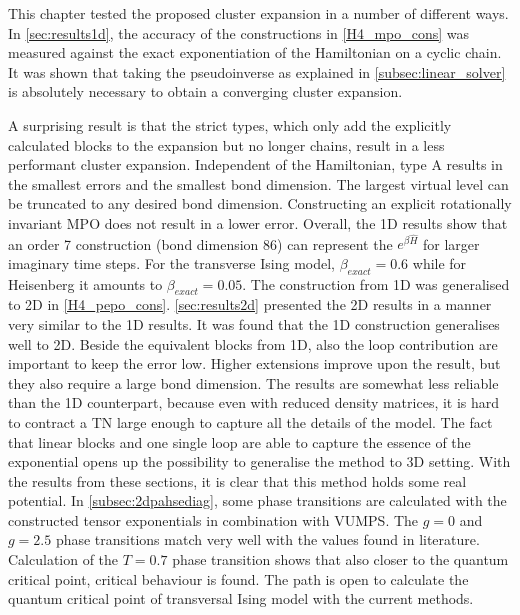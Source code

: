 This chapter tested the proposed cluster expansion in a number of different ways. In \cref{sec:results1d}, the accuracy of the constructions in \cref{H4_mpo_cons} was measured against the exact exponentiation of the Hamiltonian on a cyclic chain. It was shown that taking the pseudoinverse as explained in \cref{subsec:linear_solver} is absolutely necessary to obtain a converging cluster expansion.

A surprising result is that the strict types, which only add the explicitly calculated blocks to the expansion but no longer chains, result in a less performant cluster expansion. Independent of the Hamiltonian, type A results in the smallest errors and the smallest bond dimension. The largest virtual level can be truncated to any desired bond dimension. Constructing an explicit rotationally invariant \Gls{MPO} does not result in a lower error.
Overall, the 1D results show that an order 7 construction (bond dimension 86) can represent the $e^{\beta \hat{H}}$ for larger imaginary time steps. For the transverse Ising model, $\beta_{exact} = 0.6$ while for Heisenberg it amounts to $\beta_{exact} = 0.05$.
The construction from 1D was generalised to 2D in \cref{H4_pepo_cons}. \cref{sec:results2d} presented the 2D results in a manner very similar to the 1D results. It was found that the 1D construction generalises well to 2D. Beside the equivalent blocks from 1D, also the loop contribution are important to keep the error low. Higher extensions improve upon the result, but they also require a large bond dimension. The results are somewhat less reliable than the 1D counterpart, because even with reduced density matrices, it is hard to contract a \Gls{TN} large enough to capture all the details of the model.
The fact that linear blocks and one single loop are able to capture the essence of the exponential opens up the possibility to generalise the method to 3D setting.
With the results from these sections, it is clear that this method holds some real potential. In \cref{subsec:2dpahsediag}, some phase transitions are calculated with the constructed tensor exponentials in combination with \Gls{VUMPS}. The $g=0$ and $g=2.5$ phase transitions match very well with the values found in literature. Calculation of the $T=0.7$ phase transition shows that also closer to the quantum critical point, critical behaviour is found.
The path is open to calculate the quantum critical point of transversal Ising model with the current methods.
